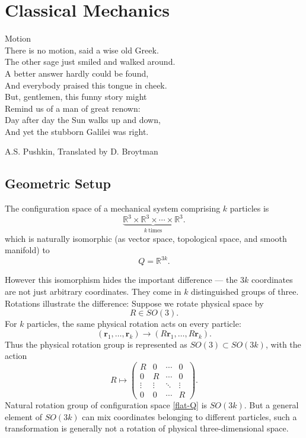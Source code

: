 \chapter{Classical Mechanics}
\label{ch:cm}

{
\setlength{}
\epigraph {
    Motion\\
There is no motion, said a wise old Greek.\\
The other sage just smiled and walked around.\\
A better answer hardly could be found,\\
And everybody praised this tongue in cheek.\\
But, gentlemen, this funny story might\\
Remind us of a man of great renown:\\
Day after day the Sun walks up and down,\\
And yet the stubborn Galilei was right.
} {A.S. Pushkin, Translated by D. Broytman }
}


\section{Geometric Setup}
\label{sec:cm-geom}

The configuration space of a mechanical system comprising $k$ particles is 
\[   
 \underbrace{\mathbb R^3\times\mathbb R^3\times\cdots\times\mathbb R^3}_{k\ \text{times}}. 
\]
which is naturally isomorphic (as vector space, topological space, and smooth manifold) to
\begin{equation}
   \label {flat-Q}
   Q=\mathbb R^{3k}.
\end{equation}

However this isomorphism hides the important difference ---
the \(3k\) coordinates are not just arbitrary coordinates. They come in \(k\)
distinguished groups of three. Rotations illustrate the difference:
Suppose we rotate physical space by
\[ R\in SO(3). \]
For \(k\) particles, the same physical rotation acts on every particle:
\[
    (\mathbf r_1,\ldots,\mathbf r_k) \longrightarrow (R\mathbf r_1,\ldots,R\mathbf r_k). 
\]
Thus the physical rotation group is represented as
$ SO(3)\subset SO(3k)$, with the action
\[ R\mapsto 
\begin{pmatrix} R&0&\cdots&0\\ 
0&R&\cdots&0\\ 
\vdots&\vdots&\ddots&\vdots\\
0&0&\cdots&R 
\end{pmatrix}. 
\]
Natural rotation group of configuration space \eqref{flat-Q} is \(SO(3k)\).
But a general element of \(SO(3k)\) can mix coordinates belonging to different particles,
such a transformation is generally not a rotation of physical three-dimensional space.

